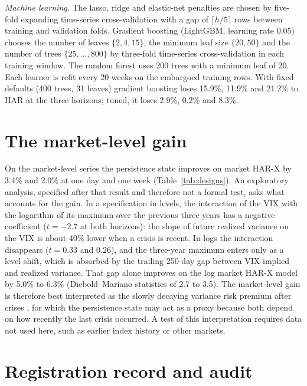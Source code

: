 \textit{Machine learning.} The lasso, ridge and elastic-net penalties are
chosen by five-fold expanding time-series cross-validation with a gap of
$\lceil h/5\rceil$ rows between training and validation folds. Gradient
boosting (LightGBM, learning rate 0.05) chooses the number of leaves
$\{2,4,15\}$, the minimum leaf size $\{20,50\}$ and the number of trees
$\{25,\dots,800\}$ by three-fold time-series cross-validation in each
training window. The random forest uses 200 trees with a minimum leaf of 20.
Each learner is refit every 20 weeks on the embargoed training rows. With
fixed defaults (400 trees, 31 leaves) gradient boosting loses 15.9\%,
11.9\% and 21.2\% to HAR at the three horizons; tuned, it loses 2.9\%, 0.2\%
and 8.3\%.

\section[\appendixname~\thesection]{The market-level gain}\label{app:market}

On the market-level series the persistence state improves on market HAR-X by
3.4\% and 2.0\% at one day and one week (Table~\ref{tab:designs}). An
exploratory analysis, specified after that result and therefore not a formal
test, asks what accounts for the gain. In a specification in levels, the
interaction of the VIX with the logarithm of its maximum over the previous
three years has a negative coefficient ($t=-2.7$ at both horizons): the
slope of future realized variance on the VIX is about 40\% lower when a
crisis is recent. In logs the interaction disappears ($t=0.33$ and $0.26$),
and the three-year maximum enters only as a level shift, which is absorbed
by the trailing 250-day gap between VIX-implied and realized variance. That
gap alone improves on the log market HAR-X model by 5.0\% to 6.3\%
(Diebold--Mariano statistics of 2.7 to 3.5). The market-level gain is
therefore best interpreted as the slowly decaying variance risk premium after
crises \citep{bates2000post, andersen2015risk}, for which the persistence
state may act as a proxy because both depend on how recently the last crisis
occurred. A test of this interpretation requires data not used here, such as
earlier index history or other markets.

\section[\appendixname~\thesection]{Registration record and audit}\label{app:ledger}

